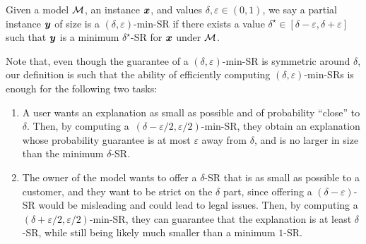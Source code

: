 \begin{definition}
    Given a model $\mathcal{M}$, an instance ${\bm{x}}$, and values $\delta, \varepsilon \in (0, 1)$, we say a partial instance ${\bm{y}}$ of size is a $(\delta, \varepsilon)$-min-SR if there exists a value $\delta^\star \in [\delta - \varepsilon, \delta + \varepsilon]$ such that
    ${\bm{y}}$ is a minimum $\delta^\star$-SR for ${\bm{x}}$ under $\mathcal{M}$.
\end{definition}

Note that, even though the guarantee of a $(\delta, \varepsilon)$-min-SR is symmetric around $\delta$, our definition is such that the ability of efficiently computing $(\delta, \varepsilon)$-min-SRs is enough for the following two tasks:
\begin{enumerate}
    \item A user wants an explanation as small as possible and of probability ``close'' to $\delta$. Then, by computing a~$(\delta-\varepsilon/2, \varepsilon/2)$-min-SR, they obtain an explanation whose probability guarantee is at most $\varepsilon$ away from $\delta$, and is no larger in size than the minimum $\delta$-SR.
    \item The owner of the model wants to offer a $\delta$-SR that is as small as possible to a customer, and they want to be strict on the $\delta$ part, since offering a $(\delta - \varepsilon)$-SR would be misleading and could lead to legal issues. Then, by computing a $(\delta+\varepsilon/2, \varepsilon/2)$-min-SR, they can guarantee that the explanation is at least $\delta$-SR, while still being likely much smaller than a minimum $1$-SR. 
\end{enumerate}

